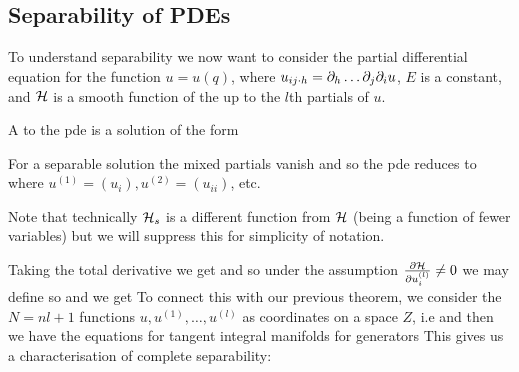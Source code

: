\documentclass{article}
\begin{document}
\subsection{Separability of PDEs}

To understand separability we now want to consider the partial differential equation 
for the function $u = u(q)$, where $u_{ij \cdot h} = \del_h \dots \del_j \del_i u$, $E$ is a constant, and $\mc{H}$ is a smooth function of the up to the $l$th partials of $u$. 

\begin{definition}
A  to the pde is a solution of the form 
\end{definition}

For a separable solution the mixed partials vanish and so the pde reduces to 
where $u^{(1)} = (u_i), u^{(2)} = (u_{ii})$, etc. 

\begin{notation}
Note that technically $\mc{H}_s$ is a different function from $\mc{H}$ (being a function of fewer variables) but we will suppress this for simplicity of notation. 
\end{notation}

Taking the total derivative we get 
and so under the assumption $\pd[\mc{H}]{u_i^{(l)}} \neq 0$ we may define 
so 
and we get
To connect this with our previous theorem, we consider the $N = nl+1$ functions $u,u^{(1)}, \dots, u^{(l)}$ as coordinates on a space $Z$, i.e 
and then we have the equations for tangent integral manifolds for generators 
This gives us a characterisation of complete separability:
\end{document}
